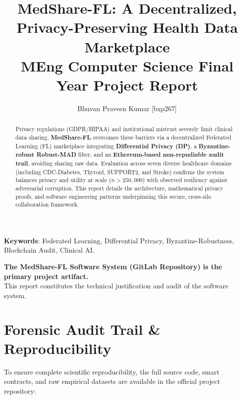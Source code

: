 \documentclass[10pt, a4paper, twocolumn]{article}
\title{\textbf{MedShare-FL: A Decentralized, Privacy-Preserving Health Data Marketplace} \\ \Large MEng Computer Science Final Year Project Report}
\author{Bhuvan Praveen Kumar [bxp267]}
\date{}
\begin{document}
\maketitle

\begin{abstract}
Privacy regulations (GDPR/HIPAA) and institutional mistrust severely limit clinical data sharing. \textbf{MedShare-FL} overcomes these barriers via a decentralized Federated Learning (FL) marketplace integrating \textbf{Differential Privacy (DP)}, a \textbf{Byzantine-robust Robust-MAD} filter, and an \textbf{Ethereum-based non-repudiable audit trail}, avoiding sharing raw data. Evaluation across seven diverse healthcare domains (including CDC-Diabetes, Thyroid, SUPPORT2, and Stroke) confirms the system balances privacy and utility at scale ($n > 250,000$) with observed resiliency against adversarial corruption. This report details the architecture, mathematical privacy proofs, and software engineering patterns underpinning this secure, cross-silo collaboration framework.
\end{abstract}

\textbf{Keywords}: Federated Learning, Differential Privacy, Byzantine-Robustness, Blockchain Audit, Clinical AI.


\begin{tcolorbox}[colback=blue!5,colframe=blue!75,title=Artifact Declaration]
\begin{center}
\textbf{The MedShare-FL Software System (GitLab Repository) is the primary project artifact.} \\
This report constitutes the technical justification and audit of the software system.
\end{center}
\end{tcolorbox}

\section{Forensic Audit Trail \& Reproducibility}
\label{sec:audit_trail}

To ensure complete scientific reproducibility, the full source code, smart contracts, and raw empirical datasets are available in the official project repository:
\end{document}
